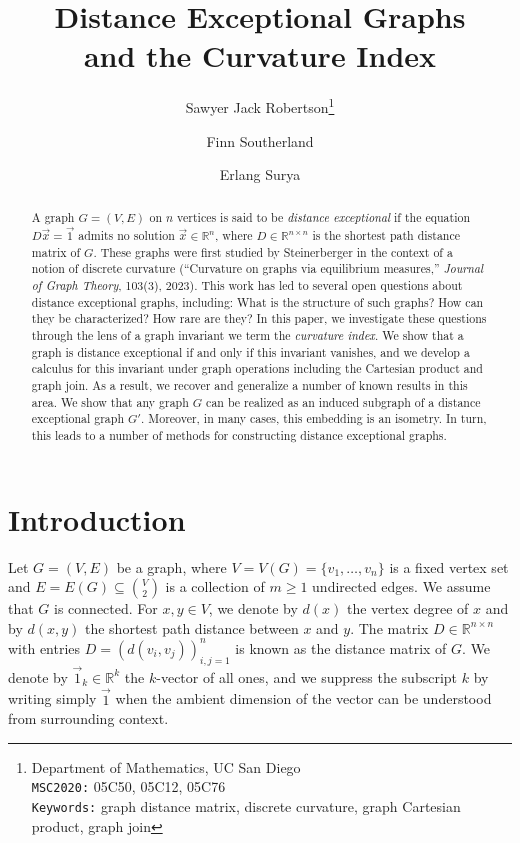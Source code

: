 \documentclass[11pt,a4paper]{article}
\title{Distance Exceptional Graphs\\and the Curvature Index}
\author{Sawyer Jack Robertson\thanks{Department of Mathematics, UC San Diego\\\hspace*{0.5cm}\texttt{MSC2020:} 05C50, 05C12, 05C76 \\\hspace*{0.5cm}\texttt{Keywords:} graph distance matrix, discrete curvature, graph Cartesian product, graph join}\and Finn Southerland\footnotemark[1]\and Erlang Surya\footnotemark[1]}
\date{}
\newcommand{\distmatrix}{D}
\newcommand{\one}{\vec{1}}
\begin{document}
	\maketitle

    \begin{abstract}
        A graph $G=(V,E)$ on $n$ vertices is said to be \emph{distance exceptional} if the equation $D\vec{x} = \vec{1}$ admits no solution $\vec{x}\in\mathbb{R}^{n}$, where $D\in\mathbb{R}^{n\times n}$ is the shortest path distance matrix of $G$. These graphs were first studied by Steinerberger in the context of a notion of discrete curvature (``Curvature on graphs via equilibrium measures,'' \emph{Journal of Graph Theory}, 103(3), 2023). This work has led to several open questions about distance exceptional graphs, including: What is the structure of such graphs? How can they be characterized? How rare are they? In this paper, we investigate these questions through the lens of a graph invariant we term the \emph{curvature index}. We show that a graph is distance exceptional if and only if this invariant vanishes, and we develop a calculus for this invariant under graph operations including the Cartesian product and graph join. As a result, we recover and generalize a number of known results in this area. We show that any graph $G$ can be realized as an induced subgraph of a distance exceptional graph $G'$. Moreover, in many cases, this embedding is an isometry. In turn, this leads to a number of methods for constructing distance exceptional graphs. 
    \end{abstract}


    \section{Introduction}\label{sec:introduction}

    Let $G=(V,E)$ be a graph, where $V=V(G)=\{v_1,\dotsc, v_n\}$ is a fixed vertex set and $E=E(G)\subseteq \binom{V}{2}$ is a collection of $m\geq 1$ undirected edges. We assume that $G$ is connected. For $x, y\in V$, we denote by $d(x)$ the vertex degree of $x$ and by $d(x, y)$ the shortest path distance between $x$ and $y$. The matrix $\distmatrix\in\mathbb{R}^{n\times n}$ with entries $\distmatrix=(d(v_i,v_j))_{i, j=1}^{n}$ is known as the distance matrix of $G$. We denote by $\one_k\in\mathbb{R}^k$ the $k$-vector of all ones, and we suppress the subscript $k$ by writing simply $\one$ when the ambient dimension of the vector can be understood from surrounding context.
\end{document}
